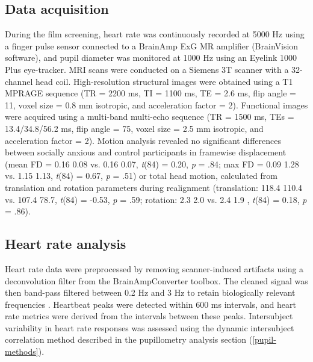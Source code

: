 \subsection{Data acquisition}
During the film screening, heart rate was continuously recorded at 5000 Hz using a finger pulse sensor connected to a BrainAmp ExG MR amplifier (BrainVision software), and pupil diameter was monitored at 1000 Hz using an Eyelink 1000 Plus eye-tracker. MRI scans were conducted on a Siemens 3T scanner with a 32-channel head coil. High-resolution structural images were obtained using a T1 MPRAGE sequence (TR = 2200 ms, TI = 1100 ms, TE = 2.6 ms, flip angle = 11\textdegree, voxel size = 0.8 mm isotropic, and acceleration factor = 2). Functional images were acquired using a multi-band multi-echo sequence (TR = 1500 ms, TEs = 13.4/34.8/56.2 ms, flip angle = 75\textdegree, voxel size = 2.5 mm isotropic, and acceleration factor = 2). Motion analysis revealed no significant differences between socially anxious and control participants in framewise displacement (mean FD = 0.16 \textpm{} 0.08 vs. 0.16 \textpm{} 0.07, \textit{t}(84) = 0.20, \textit{p} = .84; max FD = 0.09 \textpm{} 1.28 vs. 1.15 \textpm{} 1.13, \textit{t}(84) = 0.67, \textit{p} = .51) or total head motion, calculated from translation and rotation parameters during realignment (translation: 118.4 \textpm{} 110.4 vs. 107.4 \textpm{} 78.7, \textit{t}(84) = -0.53, \textit{p} = .59; rotation: 2.3 \textpm{} 2.0 vs. 2.4 \textpm{} 1.9 , \textit{t}(84) = 0.18, \textit{p} = .86).

\subsection{Heart rate analysis}
Heart rate data were preprocessed by removing scanner-induced artifacts using a deconvolution filter from the BrainAmpConverter toolbox. The cleaned signal was then band-pass filtered between 0.2 Hz and 3 Hz to retain biologically relevant frequencies \citep{avram2019}. Heartbeat peaks were detected within 600 ms intervals, and heart rate metrics were derived from the intervals between these peaks. Intersubject variability in heart rate responses was assessed using the dynamic intersubject correlation method described in the pupillometry analysis section (\ref{pupil-methods}).

